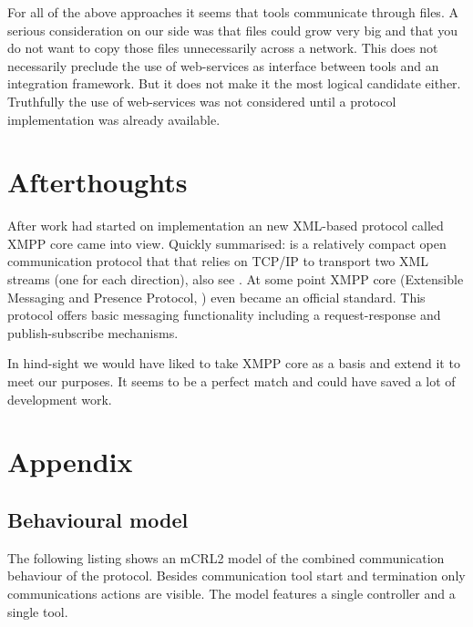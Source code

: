 \documentclass{article}
\begin{document}
   For all of the above approaches it seems that tools communicate through
   files.  A serious consideration on our side was that files could grow very
   big and that you do not want to copy those files unnecessarily across a
   network. This does not necessarily preclude the use of web-services as
   interface between tools and an integration framework. But it does not make
   it the most logical candidate either. Truthfully the use of web-services was
   not considered until a protocol implementation was already available.

  \section{Afterthoughts}

   After work had started on implementation an new XML-based protocol called
   XMPP core came into view.  Quickly summarised: is a relatively compact open
   communication protocol that that relies on TCP/IP to transport two XML
   streams (one for each direction), also see \cite{Sperberg-McQueen:06:EML}.
   At some point XMPP core (Extensible Messaging and Presence Protocol,
   \cite{rfc3920}) even became an official standard. This protocol offers basic
   messaging functionality including a request-response and publish-subscribe
   mechanisms.
   
   In hind-sight we would have liked to take XMPP core as a basis and extend it
   to meet our purposes. It seems to be a perfect match and could have saved a
   lot of development work.

  \enlargethispage*{4pt}
  

  \section{Appendix}
  \pagestyle{empty}

  \subsection{Behavioural model}
   The following listing shows an mCRL2 model of the combined communication
   behaviour of the protocol. Besides communication tool start and termination
   only communications actions are visible. The model features a single
   controller and a single tool.

  \small  \normalsize

  \pagebreak
\end{document}
